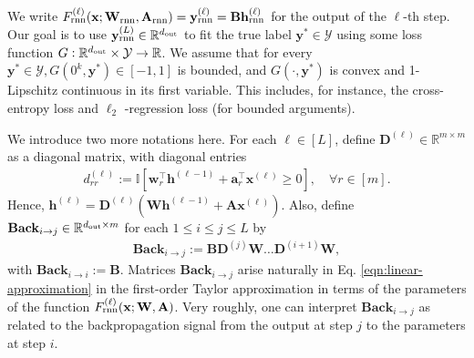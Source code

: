 \begin{definition}
	
	We write $F_{\mathrm{rnn}}^{(\ell)}(\mathbf{x}; \mathbf{W}_{\mathrm{rnn}}, \mathbf{A}_{\mathrm{rnn}})=\mathbf{y}^{(\ell)}_{\mathrm{rnn}}=\mathbf{B} \mathbf{h}^{(\ell)}_{\mathrm{rnn}}$ for the output of the $\ell$-th step. Our goal is to use $\mathbf{y}^{(L)}_{\mathrm{rnn}} \in \mathbb{R}^{d_{\mathrm{out}} }$ to fit the true label $\mathbf{y}^{\ast} \in \mathcal{Y}$ using some loss function $G: \mathbb{R}^{d_{\mathrm{out}} } \times \mathcal{Y} \rightarrow \mathbb{R}$. We assume that for every $\mathbf{y}^{\ast} \in \mathcal{Y}, G\left(0^{k}, \mathbf{y}^{\ast}\right) \in[-1,1]$ is bounded, and
	$G\left(\cdot, \mathbf{y}^{\ast}\right)$ is convex and 1-Lipschitz continuous in its first variable. This includes, for instance, the cross-entropy loss and $\ell_{2}$ -regression loss (for bounded arguments).%
	
	
	\iffalse
	We introduce two more notations here. For each $\ell \in [L]$, define $\mathbf{D}^{(\ell)} \in \mathbb{R}^{m \times m}$ as a diagonal matrix, with diagonal entries 
	\begin{align}\label{eqn:diagonal}
		d_{rr}^{(\ell)} := \mathbb{I}[\mathbf{w}_r^{\top} \mathbf{h}^{(\ell - 1)} + \mathbf{a}_r^{\top} \mathbf{x}^{(\ell)} \ge 0], \quad \forall r \in [m]. 
	\end{align}
	Hence, $\mathbf{h}^{(\ell)} = \mathbf{D}^{(\ell)} (\mathbf{W} \mathbf{h}^{(\ell-1)} + \mathbf{A} \mathbf{x}^{(\ell)})$. Also, define $\mathbf{Back}_{i \to j} \in \mathbb{R}^{d_{\mathrm{out}}  \times m}$ for each $1 \le i \le j \le L$ by
	\begin{align*}
		\mathbf{Back}_{i \to j} := \mathbf{B} \mathbf{D}^{(j)} \mathbf{W} \ldots \mathbf{D}^{(i+1)} \mathbf{W}, 
	\end{align*}
	with $\mathbf{Back}_{i \to i} := \mathbf{B}$. Matrices $\mathbf{Back}_{i \to j}$ arise naturally in Eq. \eqref{eqn:linear-approximation} in the first-order Taylor approximation in terms of the parameters of the function $F_{\mathrm{rnn}}^{(\ell)}(\mathbf{x}; \mathbf{W}, \mathbf{A})$. Very roughly, one can interpret $\mathbf{Back}_{i \to j}$ as related to the backpropagation signal from the output at step $j$ to the parameters at step $i$. 
	

\end{definition}
